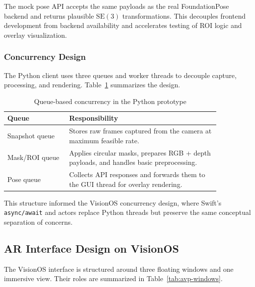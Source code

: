 The mock pose API accepts the same payloads as the real FoundationPose backend and returns plausible $\mathrm{SE}(3)$ transformations. This decouples frontend development from backend availability and accelerates testing of ROI logic and overlay visualization.

\subsubsection{Concurrency Design}

The Python client uses three queues and worker threads to decouple capture, processing, and rendering. Table~\ref{tab:python-queues} summarizes the design.

\begin{table}[H]
    \centering
    \caption{Queue-based concurrency in the Python prototype}
    \label{tab:python-queues}
    \begin{tabular}{p{0.25\linewidth}p{0.61\linewidth}}
        \toprule
        \textbf{Queue} & \textbf{Responsibility} \\
        \midrule
        Snapshot queue &
        Stores raw frames captured from the camera at maximum feasible rate. \\
        Mask/ROI queue &
        Applies circular masks, prepares RGB + depth payloads, and handles basic preprocessing. \\
        Pose queue &
        Collects API responses and forwards them to the GUI thread for overlay rendering. \\
        \bottomrule
    \end{tabular}
\end{table}

This structure informed the VisionOS concurrency design, where Swift’s \texttt{async/await} and actors replace Python threads but preserve the same conceptual separation of concerns.

\subsection{AR Interface Design on VisionOS}
\label{subsec:ar-interface-design}

The VisionOS interface is structured around three floating windows and one immersive view. Their roles are summarized in Table~\ref{tab:avp-windows}.

